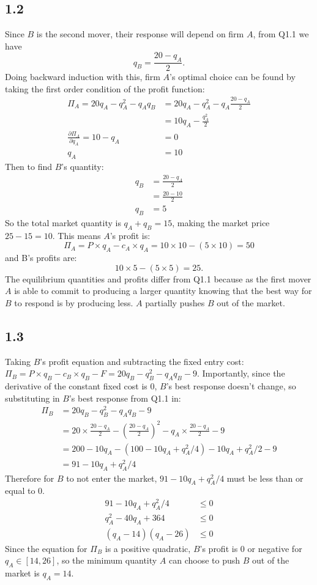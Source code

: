 \documentclass{article}
\begin{document}
\subsection*{1.2}
Since $B$ is the second mover, their response will depend on firm $A$, from Q1.1 we have
$$q_{B} = \frac{20 - q_{A}}{2}.$$
Doing backward induction with this, firm $A$'s optimal choice can be found by taking the first order condition of the profit function:
\begin{align*}
    \Pi_{A} = 20q_{A} - q_{A}^{2} - q_{A}q_{B} &= 20q_{A} - q_{A}^{2} - q_{A}\frac{20 - q_{A}}{2}\\
    &= 10q_{A} - \frac{q_{A}^{2}}{2}\\
    \frac{\partial \Pi_{A}}{\partial q_{A}} = 10 - q_{A} &= 0\\
    q_{A} &= 10
\end{align*}
Then to find $B$'s quantity:
\begin{align*}
    q_{B} &= \frac{20 - q_{A}}{2}\\
    &= \frac{20 - 10}{2}\\
    q_{B} &= 5
\end{align*}
So the total market quantity is $q_{A} + q_{B} = 15$, making the market price $25 - 15 = 10$. This means $A$'s profit is:
$$\Pi_{A} = P \times q_{A} - c_{A} \times q_{A} = 10 \times 10 - (5 \times 10) = 50$$
and B's profits are:
$$10 \times 5 - (5 \times 5) = 25.$$
The equilibrium quantities and profits differ from Q1.1 because as the first mover $A$ is able to commit to producing a larger quantity knowing that the best way for $B$ to respond is by producing less. $A$ partially pushes $B$ out of the market.

\subsection*{1.3}
Taking $B$'s profit equation and subtracting the fixed entry cost:
$\Pi_{B} = P \times q_{B} - c_{B} \times q_{B} - F = 20q_{B} - q_{B}^{2} - q_{A}q_{B} - 9.$
Importantly, since the derivative of the constant fixed cost is 0, $B$'s best response doesn't change, so substituting in $B$'s best response from Q1.1 in:
\begin{align*}
    \Pi_{B} &= 20q_{B} - q_{B}^{2} - q_{A}q_{B} - 9\\
    &= 20 \times \frac{20 - q_{A}}{2} - \left( \frac{20 - q_{A}}{2} \right)^{2} - q_{A} \times \frac{20 - q_{A}}{2} - 9\\
    &= 200 - 10q_{A} - (100 - 10q_{A} + q_{A}^{2}/4) - 10q_{A} + q_{A}^{2}/2 - 9\\
    &= 91 - 10q_{A} + q_{A}^{2}/4
\end{align*}
Therefore for $B$ to not enter the market, $91 - 10q_{A} + q_{A}^{2}/4$ must be less than or equal to 0.
\begin{align*}
    91 - 10q_{A} + q_{A}^{2}/4 &\leq 0\\
    q_{A}^{2} - 40q_{A} + 364 &\leq 0\\
    (q_{A} - 14)(q_{A} - 26) &\leq 0
\end{align*}
Since the equation for $\Pi_{B}$ is a positive quadratic, $B$'s profit is 0 or negative for $q_{A} \in [14, 26]$, so the minimum quantity $A$ can choose to push $B$ out of the market is $q_{A} = 14$.
\end{document}
